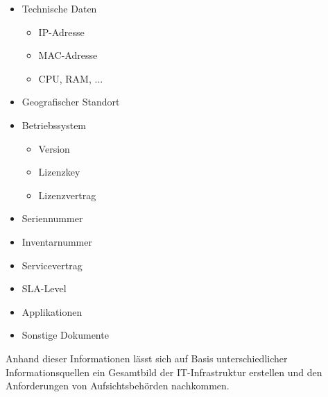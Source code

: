 \begin{itemize}
    \item Technische Daten
    \begin{itemize}
        \item IP-Adresse
        \item MAC-Adresse
        \item CPU, RAM, ...
    \end{itemize}
    \item Geografischer Standort
    \item Betriebssystem
    \begin{itemize}
        \item Version
        \item Lizenzkey
        \item Lizenzvertrag
    \end{itemize}
    \item Seriennummer
    \item Inventarnummer
    \item Servicevertrag
    \item SLA-Level
    \item Applikationen
    \item Sonstige Dokumente
\end{itemize}
\bigbreak
Anhand dieser Informationen lässt sich auf Basis unterschiedlicher Informationsquellen ein Gesamtbild der IT-Infrastruktur erstellen und den Anforderungen von Aufsichtsbehörden nachkommen.

